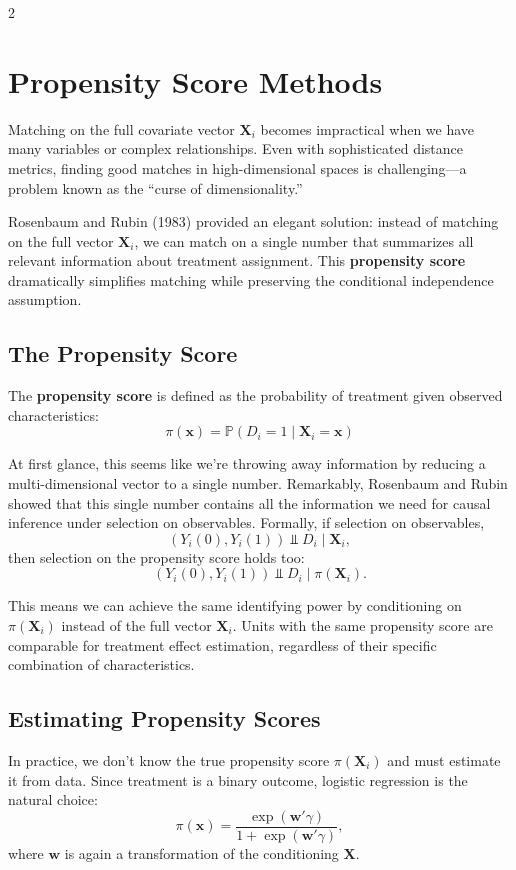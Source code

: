 \documentclass[12pt]{article}
\begin{document}
\begin{multicols}{2}
\section*{Propensity Score Methods}

Matching on the full covariate vector $\bm{X}_i$ becomes impractical when we have many variables or complex relationships.
Even with sophisticated distance metrics, finding good matches in high-dimensional spaces is challenging---a problem known as the ``curse of dimensionality.''

Rosenbaum and Rubin (1983) provided an elegant solution: instead of matching on the full vector $\bm{X}_i$, we can match on a single number that summarizes all relevant information about treatment assignment.
This \textbf{propensity score} dramatically simplifies matching while preserving the conditional independence assumption.

\subsection*{The Propensity Score}

The \textbf{propensity score} is defined as the probability of treatment given observed characteristics:
$$\pi(\bm{x}) = \mathbb{P}(D_i = 1 \mid \bm{X}_i = \bm{x})$$

At first glance, this seems like we're throwing away information by reducing a multi-dimensional vector to a single number.
Remarkably, Rosenbaum and Rubin showed that this single number contains all the information we need for causal inference under selection on observables.
Formally, if selection on observables, 
$$(Y_i(0), Y_i(1)) \Perp D_i \mid \bm{X}_i,$$ 
then selection on the propensity score holds too: 
$$(Y_i(0), Y_i(1)) \Perp D_i \mid \pi(\bm{X}_i).$$

This means we can achieve the same identifying power by conditioning on $\pi(\bm{X}_i)$ instead of the full vector $\bm{X}_i$.
Units with the same propensity score are comparable for treatment effect estimation, regardless of their specific combination of characteristics.

\subsection*{Estimating Propensity Scores}

In practice, we don't know the true propensity score $\pi(\bm{X}_i)$ and must estimate it from data.
Since treatment is a binary outcome, logistic regression is the natural choice:
$$\pi(\bm{x}) = \frac{\exp(\bm{w}'\gamma)}{1 + \exp(\bm{w}'\gamma)},$$
where $\bm{w}$ is again a transformation of the conditioning $\bm{X}$.


\end{multicols}
\end{document}
